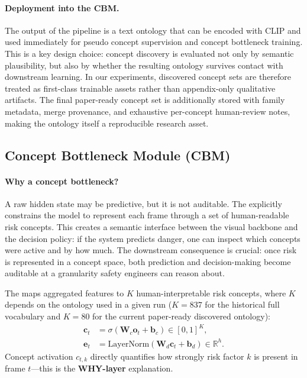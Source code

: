 \paragraph{Deployment into the CBM.}
The output of the pipeline is a text ontology that can be encoded with CLIP and
used immediately for pseudo concept supervision and concept bottleneck
training. This is a key design choice: concept discovery is evaluated not only
by semantic plausibility, but also by whether the resulting ontology survives
contact with downstream learning. In our experiments, discovered concept sets
are therefore treated as first-class trainable assets rather than appendix-only
qualitative artifacts. The final paper-ready concept set is additionally stored
with family metadata, merge provenance, and exhaustive per-concept human-review
notes, making the ontology itself a reproducible research asset.

\subsection{Concept Bottleneck Module (CBM)}

\paragraph{Why a concept bottleneck?}
A raw hidden state may be predictive, but it is not auditable.
The \cbm{} explicitly constrains the model to represent each frame
through a set of human-readable risk concepts.
This creates a semantic interface between the visual backbone and the
decision policy: if the system predicts danger, one can inspect which
concepts were active and by how much.
The downstream consequence is crucial: once risk is represented in a
concept space, both prediction and decision-making become auditable at
a granularity safety engineers can reason about.

The \cbm{} maps aggregated features to $K$ human-interpretable
risk concepts, where $K$ depends on the ontology used in a given run
($K{=}837$ for the historical full vocabulary and $K{=}80$ for the current
paper-ready discovered ontology):
\begin{align}
  \mathbf{c}_t &= \sigma(\mathbf{W}_c \mathbf{o}_t + \mathbf{b}_c)
    \in [0,1]^K, \\
  \mathbf{e}_t &= \mathrm{LayerNorm}(\mathbf{W}_d \mathbf{c}_t + \mathbf{b}_d)
    \in \mathbb{R}^h.
\end{align}
Concept activation $c_{t,k}$ directly quantifies how strongly risk
factor $k$ is present in frame $t$---this is the \textbf{WHY-layer}
explanation.

